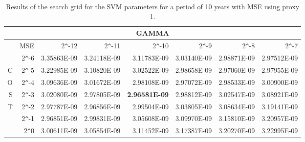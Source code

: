 \begin{table}[h!]
\centering
\begin{adjustbox}{width=\textwidth}
\begin{tabular}{|r|r|rrrrrr|}
\hline
\multicolumn{8}{|c|}{GAMMA} \tabularnewline
\hline
  &MSE& 2\verb|^|-12 & 2\verb|^|-11 & 2\verb|^|-10 & 2\verb|^|-9 & 2\verb|^|-8 & 2\verb|^|-7 \\ 
  \hline
  &2\verb|^|-6 & 3.35863E-09 & 3.24118E-09 & 3.11783E-09 & 3.03140E-09 & 2.98871E-09 & 2.97512E-09 \\ 
  C&2\verb|^|-5 & 3.22985E-09 & 3.10820E-09 & 3.02522E-09 & 2.98658E-09 & 2.97060E-09 & 2.97955E-09 \\ 
  O&2\verb|^|-4 & 3.09636E-09 & 3.01672E-09 & 2.98108E-09 & 2.97072E-09 & 2.98533E-09 & 3.00900E-09 \\ 
  S&2\verb|^|-3 & 3.02080E-09 & 2.97805E-09 & \textbf{2.96581E-09} & 2.98812E-09 & 3.02547E-09 & 3.08921E-09 \\ 
  T&2\verb|^|-2 & 2.97787E-09 & 2.96856E-09 & 2.99504E-09 & 3.03805E-09 & 3.08634E-09 & 3.19141E-09 \\ 
  &2\verb|^|-1 & 2.96851E-09 & 2.99831E-09 & 3.05608E-09 & 3.09970E-09 & 3.15810E-09 & 3.20957E-09 \\ 
  &2\verb|^|0 & 3.00611E-09 & 3.05854E-09 & 3.11452E-09 & 3.17387E-09 & 3.20270E-09 & 3.22995E-09 \\ 
   \hline
\end{tabular}
\end{adjustbox}
\caption{Results of the search grid for the SVM parameters for a period of 10 years with MSE using proxy 1.}
\end{table}